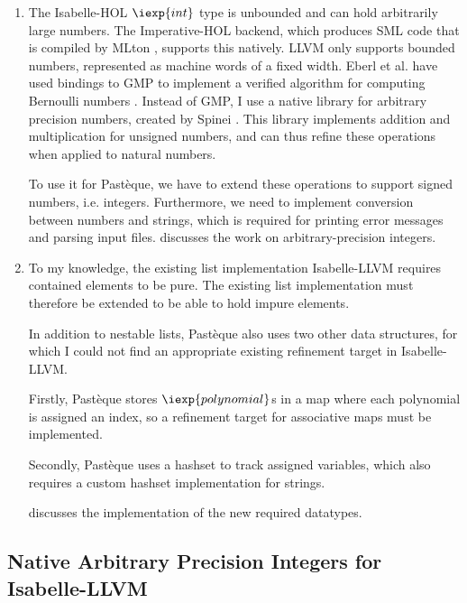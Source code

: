 \begin{enumerate}
  \item The Isabelle-HOL $\iexp{int}$ type is unbounded and can hold arbitrarily large numbers.
  The Imperative-HOL backend, which produces SML code that is compiled by MLton , supports this natively.
  LLVM only supports bounded numbers, represented as machine words of a fixed width.
  Eberl et al. have used bindings to GMP \cite{gmp} to implement a verified algorithm for computing Bernoulli numbers \cite{eberl-bernoulli-numbers}.
  Instead of GMP, I use a native library for arbitrary precision numbers, created by Spinei .
  This library implements addition and multiplication for unsigned numbers, and can thus refine these operations when applied to natural numbers.

  To use it for Pastèque, we have to extend these operations to support signed numbers, i.e. integers.
  Furthermore, we need to implement conversion between numbers and strings, which is required for printing error messages and parsing input files.
   discusses the work on arbitrary-precision integers.
  \item To my knowledge, the existing list implementation Isabelle-LLVM requires contained elements to be pure.
  The existing list implementation must therefore be extended to be able to hold impure elements.

  In addition to nestable lists, Pastèque also uses two other data structures, for which I could not find an appropriate existing refinement target in Isabelle-LLVM.

  Firstly, Pastèque stores $\iexp{polynomial}$s in a map where each polynomial is assigned an index, so a refinement target for associative maps must be implemented.

  Secondly, Pastèque uses a hashset to track assigned variables, which also requires a custom hashset implementation for strings.

   discusses the implementation of the new required datatypes.

  
\end{enumerate}

\subsection{Native Arbitrary Precision Integers for Isabelle-LLVM}\label{sec:native-arbitrary-precision-integers-for-isabelle-llvm}




